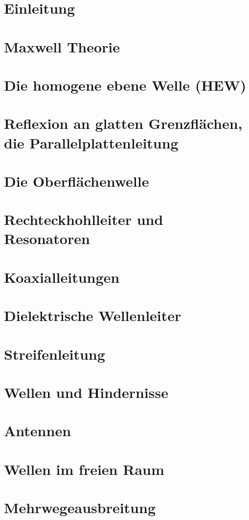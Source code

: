 	\section{Einleitung}
	
	\section{Maxwell Theorie}
	
	\section{Die homogene ebene Welle (HEW)}
	
	\section{Reflexion an glatten Grenzflächen, die Parallelplattenleitung}
	
	\section{Die Oberflächenwelle}
	
	\section{Rechteckhohlleiter und Resonatoren}
	
	\section{Koaxialleitungen}
	
	\section{Dielektrische Wellenleiter}
	
	\section{Streifenleitung}
	
	\section{Wellen und Hindernisse}
	
	\section{Antennen}
	
	\section{Wellen im freien Raum}
	
	\section{Mehrwegeausbreitung}
	